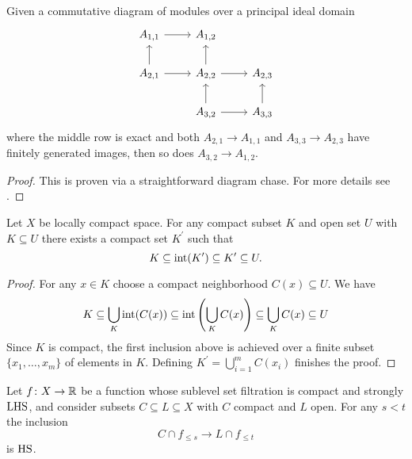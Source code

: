 \begin{lem} \label{l:commutative algebra}
	Given a commutative diagram of modules over a principal ideal domain
	\begin{equation*}
	\begin{tikzcd}
	A_{1,1} \arrow[r] & A_{1,2} & \\
	A_{2,1} \arrow[r] \arrow[u] & A_{2,2} \arrow[r] \arrow[u] & A_{2,3} \\
	& A_{3,2} \arrow[r] \arrow[u] & A_{3,3} \arrow[u]
	\end{tikzcd}
	\end{equation*}
	where the middle row is exact and both $A_{2,1} \to A_{1,1}$ and $A_{3,3} \to A_{2,3}$ have finitely generated images, then so does $A_{3,2} \to A_{1,2}$.
\end{lem}

\begin{proof}
	This is proven via a straightforward diagram chase. For more details see \cite[Lemma II.17.3]{Bredon.1997}.
\end{proof}

\begin{lem} \label{l:neighborhood third}
	Let $X$ be locally compact space.
	For any compact subset $K$ and open set $U$ with $K \subseteq U$ there exists a compact set $K^\prime$ such that
	\begin{equation*}
	K \subseteq \operatorname{int}(K^\prime) \subseteq K^\prime \subseteq U.
	\end{equation*}
\end{lem}

\begin{proof}
	For any $x \in K$ choose a compact neighborhood $C(x) \subseteq U$.
	We have
	\begin{equation*}
	K \subseteq \bigcup_K \operatorname{int}(C(x)) \subseteq \operatorname{int}\left(\bigcup_K C(x)\right) \subseteq \bigcup_K C(x) \subseteq U
	\end{equation*}
	Since $K$ is compact, the first inclusion above is achieved over a finite subset $\{x_1, \dots, x_m\}$ of elements in $K$.
	Defining $K^\prime = \bigcup_{i=1}^m C(x_i)$ finishes the proof.
\end{proof}

\begin{lem} \label{l:key lemma for q-tameness}
    Let $f \colon X \to \mathbb{R}$ be a function whose sublevel set filtration is compact and strongly $\mathrm{LHS}$, and
	consider subsets $C \subseteq L \subseteq X$ with $C$ compact and $L$ open.
	For any $s < t$ the inclusion
	\[
	C \cap f_{\leq s} \to L \cap f_{\leq t}
	\]
	is $\mathrm{HS}$.
\end{lem}

